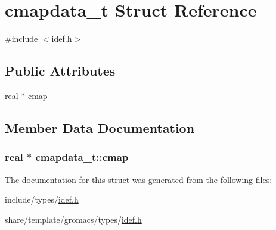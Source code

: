 \hypertarget{structcmapdata__t}{\section{cmapdata\-\_\-t \-Struct \-Reference}
\label{structcmapdata__t}
}


{\ttfamily \#include $<$idef.\-h$>$}

\subsection*{\-Public \-Attributes}
\begin{DoxyCompactItemize}
\item 
real $\ast$ \hyperlink{structcmapdata__t_a2145905c9253c46dc2781978b98f278c}{cmap}
\end{DoxyCompactItemize}


\subsection{\-Member \-Data \-Documentation}
\hypertarget{structcmapdata__t_a2145905c9253c46dc2781978b98f278c}{
\subsubsection[{cmap}]{\setlength{\rightskip}{0pt plus 5cm}real $\ast$ {\bf cmapdata\-\_\-t\-::cmap}}}\label{structcmapdata__t_a2145905c9253c46dc2781978b98f278c}


\-The documentation for this struct was generated from the following files\-:\begin{DoxyCompactItemize}
\item 
include/types/\hyperlink{include_2types_2idef_8h}{idef.\-h}\item 
share/template/gromacs/types/\hyperlink{share_2template_2gromacs_2types_2idef_8h}{idef.\-h}\end{DoxyCompactItemize}
